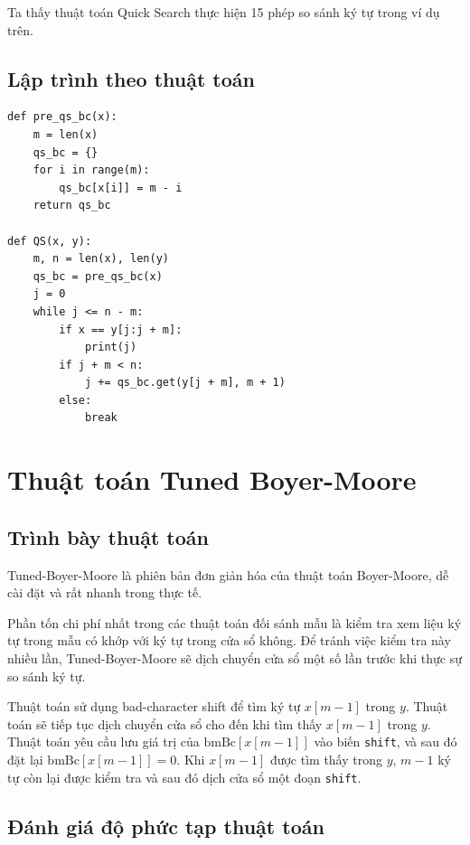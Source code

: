 \documentclass[12pt,twoside,openright]{extreport}
\begin{document}
Ta thấy thuật toán Quick Search thực hiện 15 phép so sánh ký tự trong ví dụ trên.

\subsection{Lập trình theo thuật toán}

\begin{lstlisting}[style=PythonStyle]
def pre_qs_bc(x):
    m = len(x)
    qs_bc = {}
    for i in range(m):
        qs_bc[x[i]] = m - i
    return qs_bc

def QS(x, y):
    m, n = len(x), len(y)
    qs_bc = pre_qs_bc(x)
    j = 0
    while j <= n - m:
        if x == y[j:j + m]:
            print(j)
        if j + m < n:
            j += qs_bc.get(y[j + m], m + 1)
        else:
            break
\end{lstlisting}

\section{Thuật toán Tuned Boyer-Moore}

\subsection{Trình bày thuật toán}

Tuned-Boyer-Moore là phiên bản đơn giản hóa của thuật toán Boyer-Moore, dễ cài đặt và rất nhanh trong thực tế.

Phần tốn chi phí nhất trong các thuật toán đối sánh mẫu là kiểm tra xem liệu ký tự trong mẫu có khớp với ký tự trong cửa sổ không. Để tránh việc kiểm tra này nhiều lần, Tuned-Boyer-Moore sẽ dịch chuyển cửa sổ một số lần trước khi thực sự so sánh ký tự.

Thuật toán sử dụng bad-character shift để tìm ký tự $x[m-1]$ trong $y$. Thuật toán sẽ tiếp tục dịch chuyển cửa sổ cho đến khi tìm thấy $x[m-1]$ trong $y$. Thuật toán yêu cầu lưu giá trị của $\text{bmBc}[x[m-1]]$ vào biến \texttt{shift}, và sau đó đặt lại $\text{bmBc}[x[m-1]] = 0$. Khi $x[m-1]$ được tìm thấy trong $y$, $m-1$ ký tự còn lại được kiểm tra và sau đó dịch cửa sổ một đoạn \texttt{shift}.

\subsection{Đánh giá độ phức tạp thuật toán}
\end{document}
